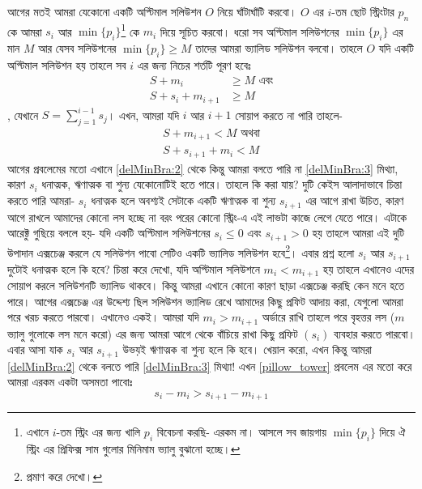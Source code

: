 \begin{solution}
আগের মতই আমরা যেকোনো একটি অপ্টিমাল সলিউশন $O$ নিয়ে ঘাঁটাঘাঁটি করবো। $O$ এর $i$-তম ছোট স্ট্রিংটার $p_n$ কে আমরা $s_i$ আর $\min\{p_i\}$\footnote{এখানে $i$-তম স্ট্রিং এর জন্য খালি $p_i$ বিবেচনা করছি- এরকম না। আসলে সব জায়গায় $\min\{p_i\}$ দিয়ে ঐ স্ট্রিং এর প্রিফিক্স সাম গুলোর মিনিমাম ভ্যালু বুঝানো হচ্ছে।} কে $m_i$ দিয়ে সূচিত করবো। ধরো সব অপ্টিমাল সলিউশনের $\min\{p_i\}$ এর মান $M$ আর যেসব সলিউশনের $\min\{p_i\} \ge M$ তাদের আমরা ভ্যালিড সলিউশন বলবো। তাহলে $O$ যদি একটি অপ্টিমাল সলিউশন হয় তাহলে সব $i$ এর জন্য নিচের শর্তটি পূরণ হবেঃ
\begin{align}
  S + m_i &\ge M \text{ এবং} \label{delMinBra:1}\\
  S + s_i + m_{i+1} &\ge M \label{delMinBra:2}
\end{align}
, যেখানে $S = \sum_{j=1}^{i-1} s_j$। এখন, আমরা যদি $i$ আর $i+1$ সোয়াপ করতে না পারি তাহলে-
\begin{align}
  S + m_{i+1} < M \text{ অথবা} \label{delMinBra:3} \\
  S + s_{i+1} + m_i < M \label{delMinBra:4}
\end{align}
আগের প্রবলেমের মতো এখানে \eqref{delMinBra:2} থেকে কিন্তু আমরা বলতে পারি না \eqref{delMinBra:3} মিথ্যা, কারণ $s_i$ ধনাত্মক, ঋণাত্মক বা শুন্য যেকোনোটিই হতে পারে। তাহলে কি করা যায়? দুটি কেইস আলাদাভাবে চিন্তা করতে পারি আমরা- $s_i$ ধনাত্মক হলে  অবশ্যই সেটাকে একটি  ঋণাত্মক বা শুন্য $s_{i+1}$ এর আগে রাখা উচিত, কারণ আগে রাখলে আমাদের কোনো লস হচ্ছে না বরং পরের কোনো স্ট্রিং-এ এই লাভটা কাজে লেগে যেতে পারে। এটাকে আরেক্টু গুছিয়ে বললে হয়- যদি একটি অপ্টিমাল সলিউশনের $s_i \le 0$ এবং $s_{i+1} > 0$ হয় তাহলে আমরা এই দুটি উপাদান এক্সচেঞ্জ করলে যে সলিউশন পাবো সেটিও একটি ভ্যালিড সলিউশন হবে\footnote{প্রমাণ করে দেখো।}। এবার প্রশ্ন হলো $s_i$ আর $s_{i+1}$ দুটোই ধনাত্মক হলে কি হবে? চিন্তা করে দেখো, যদি অপ্টিমাল সলিউশনে $m_i < m_{i+1}$ হয় তাহলে এখানেও এদের সোয়াপ করলে সলিউশনটি ভ্যালিড থাকবে। কিন্তু আমরা এখানে কোনো কারণ ছাড়া এক্সচেঞ্জ করছি কেন মনে হতে পারে। আগের এক্সচেঞ্জ এর উদ্দেশ্য ছিল সলিউশন ভ্যালিড রেখে আমাদের কিছু প্রফিট আদায় করা, যেগুলো আমরা পরে খরচ করতে পারবো। এখানেও একই। আমরা যদি $m_i > m_{i+1}$ অর্ডারে রাখি তাহলে পরে বৃহত্তর লস ($m$ ভ্যালু গুলোকে লস মনে করো) এর জন্য আমরা আগে থেকে বাঁচিয়ে রাখা কিছু প্রফিট $(s_i)$ ব্যবহার করতে পারবো।\\
এবার আসা যাক $s_i$ আর $s_{i+1}$ উভয়ই ঋণাত্মক বা শুন্য হলে কি হবে। খেয়াল করো, এখন কিন্তু আমরা \eqref{delMinBra:2} থেকে বলতে পারি \eqref{delMinBra:3} মিথ্যা! এখন \ref{pillow_tower} প্রবলেম এর মতো করে আমরা এরকম একটা অসমতা পাবোঃ
\begin{equation}
  s_i - m_i > s_{i+1} - m_{i+1} \label{delMinBra:5}

\end{equation}
\end{solution}
